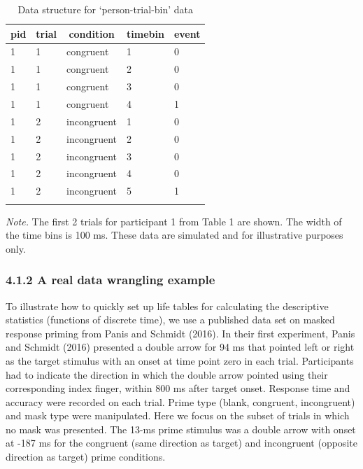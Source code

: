 \documentclass[
  man,floatsintext]{apa6}
\begin{document}
\begin{table}[H]

\begin{center}
\begin{threeparttable}

\caption{\label{tab:ha-data-table}Data structure for `person-trial-bin' data}

\begin{tabular}{lllll}
\toprule
pid & \multicolumn{1}{c}{trial} & \multicolumn{1}{c}{condition} & \multicolumn{1}{c}{timebin} & \multicolumn{1}{c}{event}\\
\midrule
1 & 1 & congruent & 1 & 0\\
1 & 1 & congruent & 2 & 0\\
1 & 1 & congruent & 3 & 0\\
1 & 1 & congruent & 4 & 1\\
1 & 2 & incongruent & 1 & 0\\
1 & 2 & incongruent & 2 & 0\\
1 & 2 & incongruent & 3 & 0\\
1 & 2 & incongruent & 4 & 0\\
1 & 2 & incongruent & 5 & 1\\
\bottomrule
\addlinespace
\end{tabular}

\begin{tablenotes}[para]
\normalsize{\textit{Note.} The first 2 trials for participant 1 from Table 1 are shown. The width of the time bins is 100 ms. These data are simulated and for illustrative purposes only.}
\end{tablenotes}

\end{threeparttable}
\end{center}

\end{table}

\subsubsection{4.1.2 A real data wrangling example}\label{a-real-data-wrangling-example}

To illustrate how to quickly set up life tables for calculating the descriptive statistics (functions of discrete time), we use a published data set on masked response priming from Panis and Schmidt (2016).
In their first experiment, Panis and Schmidt (2016) presented a double arrow for 94 ms that pointed left or right as the target stimulus with an onset at time point zero in each trial. Participants had to indicate the direction in which the double arrow pointed using their corresponding index finger, within 800 ms after target onset. Response time and accuracy were recorded on each trial. Prime type (blank, congruent, incongruent) and mask type were manipulated. Here we focus on the subset of trials in which no mask was presented. The 13-ms prime stimulus was a double arrow with onset at -187 ms for the congruent (same direction as target) and incongruent (opposite direction as target) prime conditions.
\end{document}
